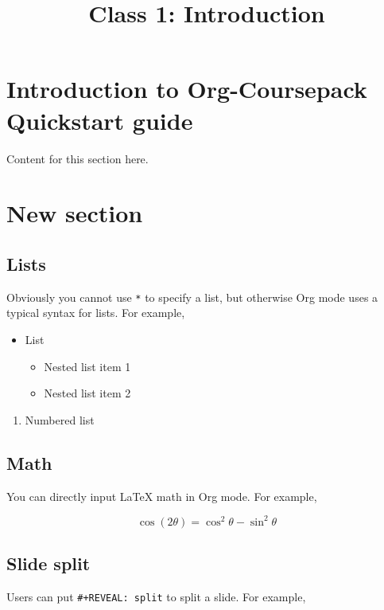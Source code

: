 \documentclass[10pt,article]{article}
\date{\vspace{-6ex}}
\title{Class 1: Introduction}
\begin{document}
\maketitle
{} 
\thispagestyle{fancy}

\setcounter{tocdepth}{1}
\tableofcontents
\vspace{6ex}

\section{Introduction to Org-Coursepack Quickstart guide}
\label{sec:org4a2b6c9}
Content for this section here.
\section{New section}
\label{sec:orgc9353ff}
\subsection{Lists}
\label{sec:org9ba10fb}
Obviously you cannot use \texttt{*} to specify a list, but otherwise Org mode
uses a typical syntax for lists. For example,

\begin{itemize}
\item List
\begin{itemize}
\item Nested list item 1
\item Nested list item 2
\end{itemize}
\end{itemize}


\begin{enumerate}
\item Numbered list
\end{enumerate}

\subsection{Math}
\label{sec:org88a9dc3}
You can directly input \LaTeX{} math in Org mode. For example,

\[ \cos (2\theta) = \cos^2 \theta - \sin^2 \theta \]
\subsection{Slide split}
\label{sec:org6a4cbce}
Users can put \texttt{\#+REVEAL: split} to split a slide. For example,
\end{document}
